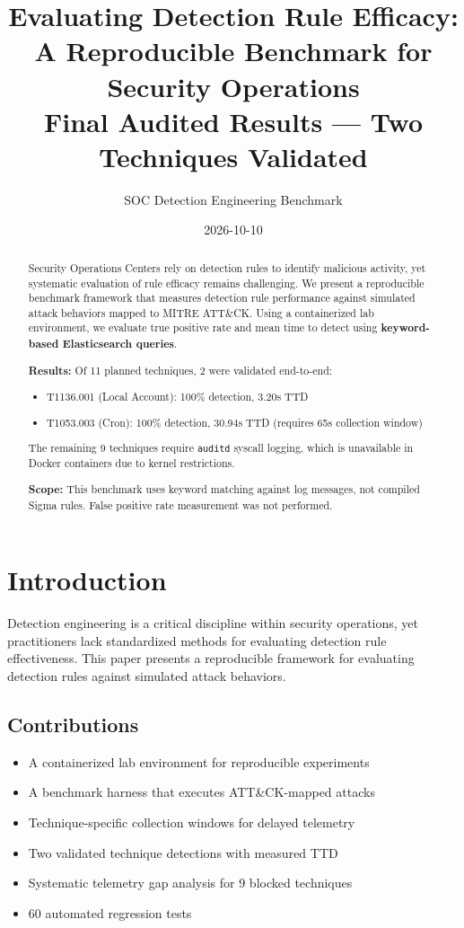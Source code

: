 \documentclass[11pt,a4paper]{article}
\title{Evaluating Detection Rule Efficacy: A Reproducible Benchmark for Security Operations\\
\large{Final Audited Results --- Two Techniques Validated}}
\author{SOC Detection Engineering Benchmark}
\date{2026-10-10}
\begin{document}
\maketitle

\begin{abstract}
Security Operations Centers rely on detection rules to identify malicious activity, yet systematic evaluation of rule efficacy remains challenging. We present a reproducible benchmark framework that measures detection rule performance against simulated attack behaviors mapped to MITRE ATT\&CK. Using a containerized lab environment, we evaluate true positive rate and mean time to detect using \textbf{keyword-based Elasticsearch queries}.

\textbf{Results:} Of 11 planned techniques, 2 were validated end-to-end:
\begin{itemize}
    \item T1136.001 (Local Account): 100\% detection, 3.20s TTD
    \item T1053.003 (Cron): 100\% detection, 30.94s TTD (requires 65s collection window)
\end{itemize}

The remaining 9 techniques require \texttt{auditd} syscall logging, which is unavailable in Docker containers due to kernel restrictions.

\textbf{Scope:} This benchmark uses keyword matching against log messages, not compiled Sigma rules. False positive rate measurement was not performed.
\end{abstract}

\section{Introduction}

Detection engineering is a critical discipline within security operations, yet practitioners lack standardized methods for evaluating detection rule effectiveness. This paper presents a reproducible framework for evaluating detection rules against simulated attack behaviors.

\subsection{Contributions}

\begin{itemize}
    \item A containerized lab environment for reproducible experiments
    \item A benchmark harness that executes ATT\&CK-mapped attacks
    \item Technique-specific collection windows for delayed telemetry
    \item Two validated technique detections with measured TTD
    \item Systematic telemetry gap analysis for 9 blocked techniques
    \item 60 automated regression tests
\end{itemize}
\end{document}
